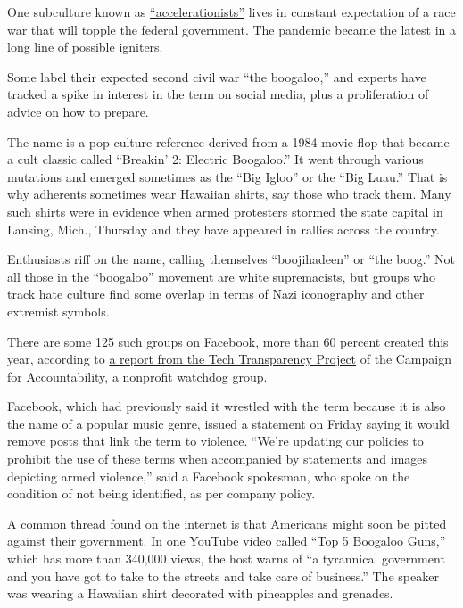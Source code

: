 One subculture known as
\href{https://www.nytimes3xbfgragh.onion/2020/01/22/us/white-supremacy-the-base.html}{``accelerationists''}
lives in constant expectation of a race war that will topple the federal
government. The pandemic became the latest in a long line of possible
igniters.

Some label their expected second civil war ``the boogaloo,'' and experts
have tracked a spike in interest in the term on social media, plus a
proliferation of advice on how to prepare.

The name is a pop culture reference derived from a 1984 movie flop that
became a cult classic called ``Breakin' 2: Electric Boogaloo.'' It went
through various mutations and emerged sometimes as the ``Big Igloo'' or
the ``Big Luau.'' That is why adherents sometimes wear Hawaiian shirts,
say those who track them. Many such shirts were in evidence when armed
protesters stormed the state capital in Lansing, Mich., Thursday and
they have appeared in rallies across the country.

Enthusiasts riff on the name, calling themselves ``boojihadeen'' or
``the boog.'' Not all those in the ``boogaloo'' movement are white
supremacists, but groups who track hate culture find some overlap in
terms of Nazi iconography and other extremist symbols.

There are some 125 such groups on Facebook, more than 60 percent created
this year, according to
\href{https://www.techtransparencyproject.org/articles/extremists-are-using-facebook-to-organize-for-civil-war-amid-coronavirus}{a
report from the Tech Transparency Project} of the Campaign for
Accountability, a nonprofit watchdog group.

Facebook, which had previously said it wrestled with the term because it
is also the name of a popular music genre, issued a statement on Friday
saying it would remove posts that link the term to violence. ``We're
updating our policies to prohibit the use of these terms when
accompanied by statements and images depicting armed violence,'' said a
Facebook spokesman, who spoke on the condition of not being identified,
as per company policy.

A common thread found on the internet is that Americans might soon be
pitted against their government. In one YouTube video called ``Top 5
Boogaloo Guns,'' which has more than 340,000 views, the host warns of
``a tyrannical government and you have got to take to the streets and
take care of business.'' The speaker was wearing a Hawaiian shirt
decorated with pineapples and grenades.

